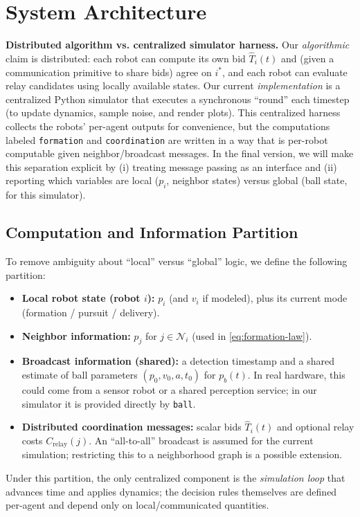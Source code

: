 \documentclass[conference]{IEEEtran}
\begin{document}
\section{System Architecture}

\noindent\textbf{Distributed algorithm vs. centralized simulator harness.} Our \emph{algorithmic} claim is distributed: each robot can compute its own bid \(\widehat{T}_i(t)\) and (given a communication primitive to share bids) agree on \(i^\ast\), and each robot can evaluate relay candidates using locally available states. Our current \emph{implementation} is a centralized Python simulator that executes a synchronous ``round'' each timestep (to update dynamics, sample noise, and render plots). This centralized harness collects the robots' per-agent outputs for convenience, but the computations labeled \texttt{formation} and \texttt{coordination} are written in a way that is per-robot computable given neighbor/broadcast messages. In the final version, we will make this separation explicit by (i) treating message passing as an interface and (ii) reporting which variables are local (\(p_i\), neighbor states) versus global (ball state, for this simulator).

\subsection{Computation and Information Partition}
To remove ambiguity about ``local'' versus ``global'' logic, we define the following partition:
\begin{itemize}
    \item \textbf{Local robot state (robot \(i\)):} \(p_i\) (and \(v_i\) if modeled), plus its current mode (formation / pursuit / delivery).
    \item \textbf{Neighbor information:} \(p_j\) for \(j \in \mathcal{N}_i\) (used in \eqref{eq:formation-law}).
    \item \textbf{Broadcast information (shared):} a detection timestamp and a shared estimate of ball parameters \((p_0,v_0,a,t_0)\) for \(p_b(t)\). In real hardware, this could come from a sensor robot or a shared perception service; in our simulator it is provided directly by \texttt{ball}.
    \item \textbf{Distributed coordination messages:} scalar bids \(\widehat{T}_i(t)\) and optional relay costs \(C_{\mathrm{relay}}(j)\). An ``all-to-all'' broadcast is assumed for the current simulation; restricting this to a neighborhood graph is a possible extension.
\end{itemize}
\noindent Under this partition, the only centralized component is the \emph{simulation loop} that advances time and applies dynamics; the decision rules themselves are defined per-agent and depend only on local/communicated quantities.
\end{document}
